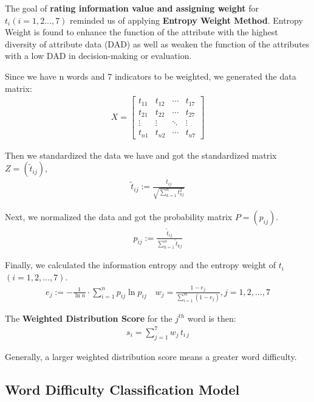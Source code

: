 The goal of \textbf{rating information value and assigning weight} for $t_{i} (i=1,2...,7)$ reminded us of applying \textbf{Entropy Weight Method}. Entropy Weight is found to enhance the function of the attribute with the highest diversity of attribute data (DAD) as well as weaken the function of the attributes with a low DAD in decision-making or evaluation.
\par Since we have n words and 7 indicators to be weighted, we generated the data matrix:
\begin{align}
	X=\left[\begin{array}{cccc}
			t_{11}  & t_{12}  & \cdots & t_{17} \\
			t_{21}  & t_{22}  & \cdots & t_{27} \\
			\vdots  & \vdots  & \ddots & \vdots  \\
			t_{n 1} & t_{n 2} & \cdots & t_{n7}
		\end{array}\right]
\end{align}
\par Then we standardized the data we have and got the standardized matrix $Z=(\tilde{t}_{i j})$,
\begin{align}
	\tilde{t}_{i j}:=\frac{t_{i j}}{\sqrt{\sum\limits_{k=1}^{n} t_{k j}^{2}}}
\end{align}
\par Next, we normalized the data and got the probability matrix $P=(p_{i j})$. 
\begin{align}
	p_{i j}:=\frac{\tilde{t}_{i j}}{\sum\limits_{k=1}^{n} \tilde{t}_{k j}}
\end{align}
\par Finally, we calculated the information entropy and the entropy weight of $t_{i}$ $(i=1,2,...,7)$.
\begin{align}
	e_{j}:=-\frac{1}{\ln n} \cdot \sum_{i=1}^{n} p_{i j} \ln p_{i j}    \quad w_{j}=\frac{1-e_{j}}{\sum\limits_{i=1}^{m} (1-e_{j})}, j=1,2,...,7
\end{align}
\par The \textbf{Weighted Distribution Score} for the $j^{th}$ word is then:
\begin{align}
    s_{i}=\sum_{j=1}^{7}w_{j}\,t_{i\,j}
\end{align}

Generally, a larger weighted distribution score means a greater word difficulty.


\subsection{Word Difficulty Classification Model}

